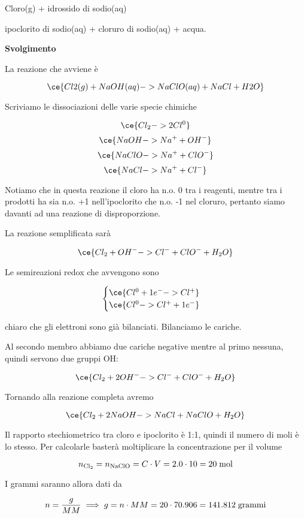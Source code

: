 \begin{center}
    Cloro(g) + idrossido di sodio(aq) \ce{->} 
    
    \ce{->} ipoclorito di sodio(aq) + cloruro di sodio(aq) + acqua. 
\end{center}

\large\textbf{Svolgimento}\normalsize

\vspace{0.2cm}La reazione che avviene è

$$\ce{Cl2(g) + NaOH(aq) -> NaClO(aq) + NaCl + H2O}$$

Scriviamo le dissociazioni delle varie specie chimiche

$$\ce{Cl_2 -> 2Cl^0 }$$
$$\ce{NaOH -> Na^+ + OH^-}$$
$$\ce{NaClO -> Na^+ + ClO^-}$$
$$\ce{NaCl -> Na^+ + Cl^-}$$

Notiamo che in questa reazione il cloro ha n.o. 0 tra i reagenti, mentre tra i prodotti ha sia n.o. +1 nell'ipoclorito che n.o. -1 nel cloruro, pertanto siamo davanti ad una reazione di disproporzione.

La reazione semplificata sarà

$$\ce{Cl_2 + OH^- -> Cl^- + ClO^- + H_2O}$$

Le semireazioni redox che avvengono sono

$$\begin{cases}
    \ce{Cl^{0} + 1e^- -> Cl^+}\\
    \ce{Cl^{0} -> Cl^+ + 1e^-}
\end{cases}$$

\E chiaro che gli elettroni sono già bilanciati. Bilanciamo le cariche.

Al secondo membro abbiamo due cariche negative mentre al primo nessuna, quindi servono due gruppi OH:

$$\ce{Cl_2 + 2OH^- -> Cl^- + ClO^- + H_2O}$$

Tornando alla reazione completa avremo

$$\ce{Cl_2 + 2NaOH -> NaCl + NaClO + H_2O}$$

Il rapporto stechiometrico tra cloro e ipoclorito è 1:1, quindi il numero di moli è lo stesso. Per calcolarle basterà moltiplicare la concentrazione per il volume

$$n_{\rm Cl_2}=n_{\rm NaClO}=C \cdot V=2.0 \cdot 10=20 \; \rm mol$$

I grammi saranno allora dati da

$$n=\frac{g}{MM} \implies g=n \cdot MM=20 \cdot 70.906=141.812 \; \rm grammi$$


